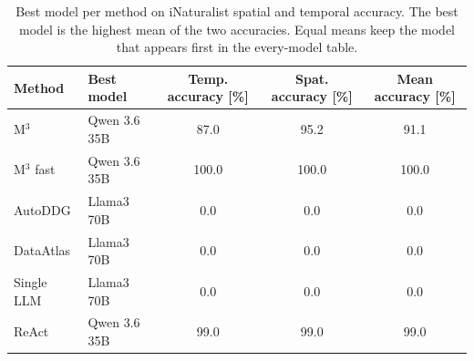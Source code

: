 \begin{table}
\caption{Best model per method on iNaturalist spatial and temporal accuracy. The best model is the highest mean of the two accuracies. Equal means keep the model that appears first in the every-model table.}
\label{tab:best_method_inat_spat_temp}
\begin{tabular}{llccc}
\toprule
Method & Best model & Temp. accuracy [\%] & Spat. accuracy [\%] & Mean accuracy [\%] \\
\midrule
M$^3$ & Qwen 3.6 35B & 87.0 & 95.2 & 91.1 \\
M$^3$ fast & Qwen 3.6 35B & 100.0 & 100.0 & 100.0 \\
AutoDDG & Llama3 70B & 0.0 & 0.0 & 0.0 \\
DataAtlas & Llama3 70B & 0.0 & 0.0 & 0.0 \\
Single LLM & Llama3 70B & 0.0 & 0.0 & 0.0 \\
ReAct & Qwen 3.6 35B & 99.0 & 99.0 & 99.0 \\
\bottomrule
\end{tabular}
\end{table}
